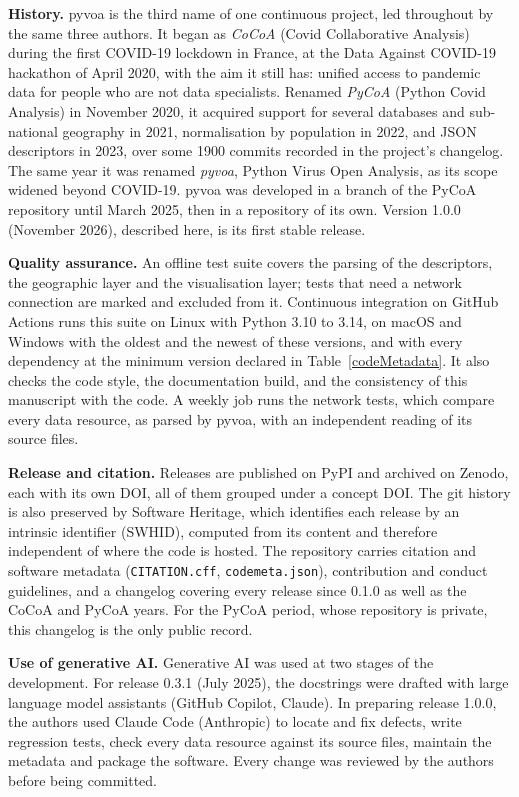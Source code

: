 \documentclass[preprint,12pt,a4paper]{elsarticle}
\begin{document}
\textbf{History.} pyvoa is the third name of one continuous project, led
throughout by the same three authors. It began as \emph{CoCoA} (Covid
Collaborative Analysis) during the first COVID-19 lockdown in France, at the
Data Against COVID-19 hackathon of April 2020, with the aim it still has:
unified access to pandemic data for people who are not data specialists.
Renamed \emph{PyCoA} (Python Covid Analysis) in November 2020, it acquired
support for several databases and sub-national geography in 2021,
normalisation by population in 2022, and JSON descriptors in 2023, over some
1900 commits recorded in the project's changelog. The same year it was
renamed \emph{pyvoa}, Python Virus Open Analysis, as its scope widened beyond
COVID-19. pyvoa was developed in a branch of the PyCoA repository until March
2025, then in a repository of its own. Version 1.0.0 (November 2026),
described here, is its first stable release.

\textbf{Quality assurance.} An offline test suite covers the parsing of the
descriptors, the geographic layer and the visualisation layer; tests that
need a network connection are marked and excluded from it. Continuous
integration on GitHub Actions runs this suite on Linux with Python 3.10 to
3.14, on macOS and Windows with the oldest and the newest of these versions,
and with every dependency at the minimum version declared in
Table~\ref{codeMetadata}. It also checks the code style, the documentation
build, and the consistency of this manuscript with the code. A weekly job
runs the network tests, which compare every data resource, as parsed by
pyvoa, with an independent reading of its source files.

\textbf{Release and citation.} Releases are published on PyPI and archived on
Zenodo, each with its own DOI, all of them grouped under a concept DOI. The
git history is also preserved by Software Heritage, which identifies each
release by an intrinsic identifier (SWHID), computed from its content and
therefore independent of where the code is hosted. The repository carries
citation and software metadata (\texttt{CITATION.cff},
\texttt{codemeta.json}), contribution and conduct guidelines, and a changelog
covering every release since 0.1.0 as well as the CoCoA and PyCoA years. For
the PyCoA period, whose repository is private, this changelog is the only
public record.

\textbf{Use of generative AI.} Generative AI was used at two stages of the
development. For release 0.3.1 (July 2025), the docstrings were drafted with
large language model assistants (GitHub Copilot, Claude). In preparing
release 1.0.0, the authors used Claude Code (Anthropic) to locate and fix
defects, write regression tests, check every data resource against its
source files, maintain the metadata and package the software. Every change
was reviewed by the authors before being committed.
\end{document}
